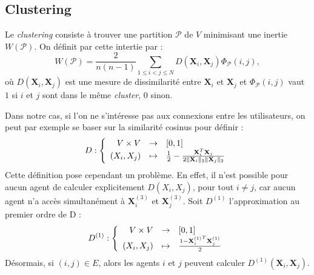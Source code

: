 \documentclass[a4paper]{article}
\begin{document}
\subsection{Clustering}
\label{sub:clustering}
Le \emph{clustering} consiste à trouver une partition $\mathcal{P}$ de $V$ minimisant
une inertie $W(\mathcal{P})$. On définit par cette intertie par :
\[
    W(\mathcal{P}) = \frac{2}{n(n-1)} \sum_{1 \leq i < j \leq N} D(\mathbf{X}_i, \mathbf{X}_j) \Phi_{\mathcal{P}}(i, j),
\]
où $D(\mathbf{X}_i, \mathbf{X}_j)$ est une mesure de dissimilarité entre
$\mathbf{X}_i$ et $\mathbf{X}_j$ et $\Phi_{\mathcal{P}}(i, j)$
vaut $1$ si $i$ et $j$ sont dans le même \emph{cluster}, $0$ sinon.

Dans notre cas, si l'on ne s'intéresse pas aux connexions entre les utilisateurs,
on peut par exemple se baser sur la similarité cosinus pour définir :
\[
    D:\left\{
        \begin{array}{r c l}
            V \times V & \rightarrow & [0, 1] \\
            (X_i, X_j) & \mapsto & \frac{1}{2} - \frac{\mathbf{X}_i^T \mathbf{X}_j}{2\|\mathbf{X}_i\|_2 \|\mathbf{X}_j\|_2}
        \end{array}
    \right.
\]
Cette définition pose cependant un problème. En effet, il n'est possible pour aucun
agent de calculer explicitement $D(X_i,X_j)$, pour tout $i \neq j$, car aucun agent n'a accès
simultanément à $\mathbf{X}^{(3)}_i$ et $\mathbf{X}^{(3)}_j$. Soit $D^{(1)}$ l'approximation \og{} au
premier ordre \fg de D :
\[
    D^{(1)}:\left\{
        \begin{array}{r c l}
            V \times V & \rightarrow & [0, 1] \\
            (X_i, X_j) & \mapsto & \frac{1 - {\mathbf{X}^{(1)}_i}^T \mathbf{X}^{(1)}_j}{2}
        \end{array}
    \right.
\]
Désormais, si $(i, j) \in E$, alors les agents $i$ et $j$ peuvent calculer
$D^{(1)}(\mathbf{X}_i, \mathbf{X}_j)$.
\end{document}
